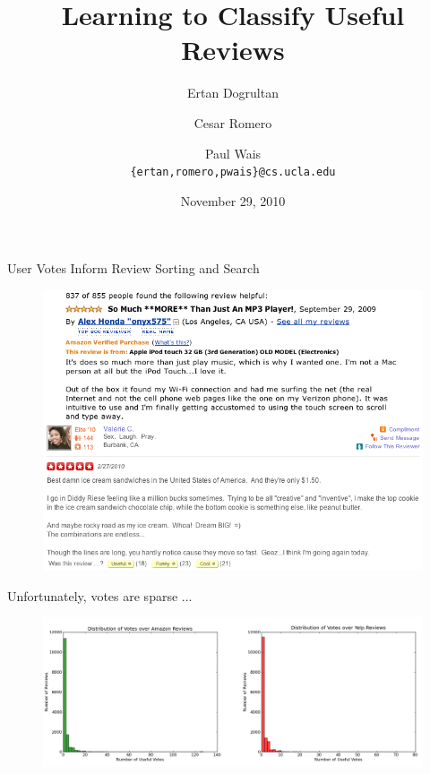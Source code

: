 \documentclass{beamer}
\title{Learning to Classify Useful Reviews}
\author{Ertan Dogrultan \and Cesar Romero \and Paul Wais\\
\texttt{\{ertan,romero,pwais\}@cs.ucla.edu}}
\date{November 29, 2010}
\begin{document}
\maketitle{}

\begin{frame}{User Votes Inform Review Sorting and Search}
\begin{figure}[h]
  \centering
  \includegraphics[scale=.4]{review_ex_1}
\end{figure}
\end{frame}

\begin{frame}{Unfortunately, votes are sparse ...}
\begin{figure}[h]
  \centering
  \includegraphics[width=\linewidth]{histos}
  \label{fig:histos}
\end{figure}
\end{frame}
\end{document}

